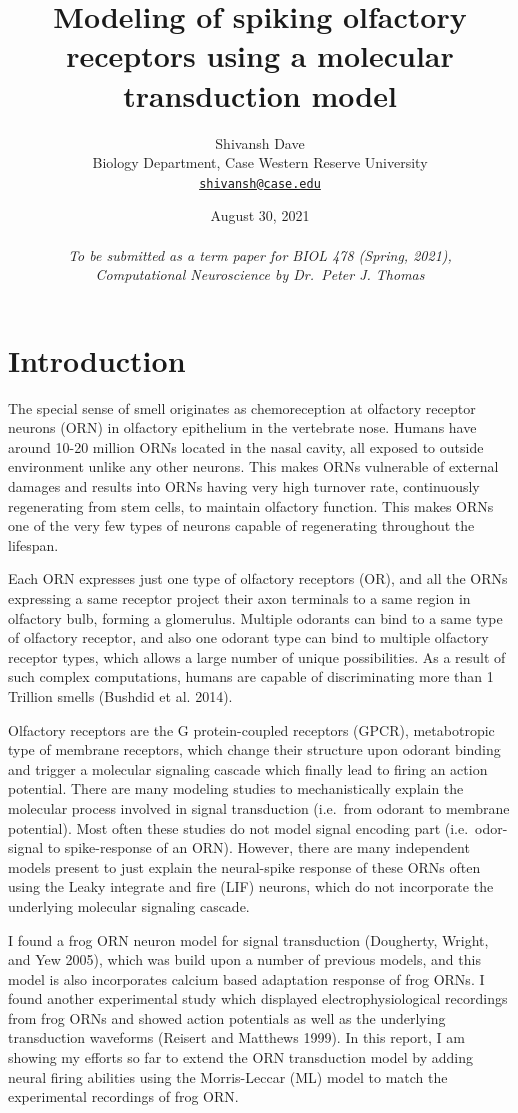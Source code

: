 \documentclass[
]{article}
\title{Modeling of spiking olfactory receptors using a molecular transduction model}
\author{Shivansh Dave\\
Biology Department, Case Western Reserve University\\
\href{mailto:shivansh@case.edu}{\nolinkurl{shivansh@case.edu}}}
\date{August 30, 2021\\
~\\
\emph{To be submitted as a term paper for BIOL 478 (Spring, 2021),}\\
\emph{Computational Neuroscience by Dr.~Peter J. Thomas}}
\begin{document}
\maketitle

{
\setcounter{tocdepth}{2}
\tableofcontents
}
\newpage
{}

\hypertarget{introduction}{%
\section{Introduction}\label{introduction}}

The special sense of smell originates as chemoreception at olfactory receptor neurons (ORN) in olfactory epithelium in the vertebrate nose. Humans have around 10-20 million ORNs located in the nasal cavity, all exposed to outside environment unlike any other neurons. This makes ORNs vulnerable of external damages and results into ORNs having very high turnover rate, continuously regenerating from stem cells, to maintain olfactory function. This makes ORNs one of the very few types of neurons capable of regenerating throughout the lifespan.

Each ORN expresses just one type of olfactory receptors (OR), and all the ORNs expressing a same receptor project their axon terminals to a same region in olfactory bulb, forming a glomerulus. Multiple odorants can bind to a same type of olfactory receptor, and also one odorant type can bind to multiple olfactory receptor types, which allows a large number of unique possibilities. As a result of such complex computations, humans are capable of discriminating more than 1 Trillion smells (Bushdid et al. 2014).

Olfactory receptors are the G protein-coupled receptors (GPCR), metabotropic type of membrane receptors, which change their structure upon odorant binding and trigger a molecular signaling cascade which finally lead to firing an action potential. There are many modeling studies to mechanistically explain the molecular process involved in signal transduction (i.e.~from odorant to membrane potential). Most often these studies do not model signal encoding part (i.e.~odor-signal to spike-response of an ORN). However, there are many independent models present to just explain the neural-spike response of these ORNs often using the Leaky integrate and fire (LIF) neurons, which do not incorporate the underlying molecular signaling cascade.

I found a frog ORN neuron model for signal transduction (Dougherty, Wright, and Yew 2005), which was build upon a number of previous models, and this model is also incorporates calcium based adaptation response of frog ORNs. I found another experimental study which displayed electrophysiological recordings from frog ORNs and showed action potentials as well as the underlying transduction waveforms (Reisert and Matthews 1999). In this report, I am showing my efforts so far to extend the ORN transduction model by adding neural firing abilities using the Morris-Leccar (ML) model to match the experimental recordings of frog ORN.
\end{document}
